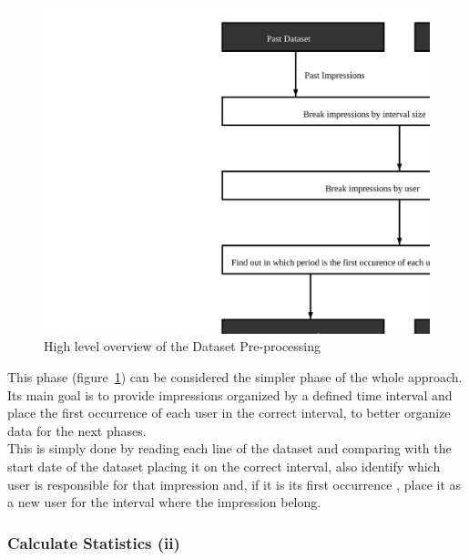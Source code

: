 \begin{figure}[h] \begin{center} \leavevmode
\includegraphics[]{pre_processing_i} \caption{ High level overview
of the Dataset Pre-processing} \label{fig:pre_processing_i} \end{center} \end{figure}

This phase (figure~\ref{fig:pre_processing_i}) can be considered the simpler phase of the whole approach. Its main
goal is to provide impressions organized by a defined time interval and 
place the first occurrence of each user in the correct interval, to better
organize data for the next phases.
\\

This is simply done by reading each line of the dataset and comparing with the
start date of the dataset placing it on the correct interval, also identify
which user is responsible for that impression and, if it is its first occurrence
, place it as a new user for the interval where the impression belong.

\subsubsection{Calculate Statistics (ii)}\label{subsubsec:stats}


